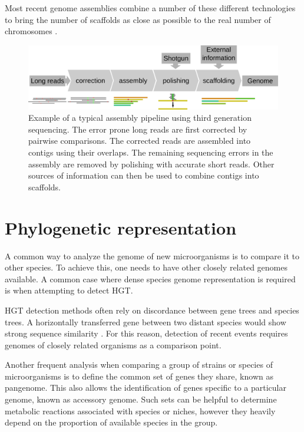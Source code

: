 Most recent genome assemblies combine a number of these different technologies to bring the number of scaffolds as close as possible to the real number of chromosomes .

\begin{figure}[htb]
    \includegraphics[width=\textwidth]{Parts/Part01/gfx/assembly_pipeline.pdf}
    \caption{Example of a typical assembly pipeline using third generation sequencing. The error prone long reads are first corrected by pairwise comparisons. The corrected reads are assembled into contigs using their overlaps. The remaining sequencing errors in the assembly are removed by polishing with accurate short reads. Other sources of information can then be used to combine contigs into scaffolds.}
    \label{fig:01-03:assembly}
\end{figure}

\section{Phylogenetic representation}

A common way to analyze the genome of new microorganisms is to compare it to other species. To achieve this, one needs to have other closely related genomes available. A common case where dense species genome representation is required is when attempting to detect \acrshort{HGT}.

\acrshort{HGT} detection methods often rely on discordance between gene trees and species trees. A horizontally transferred gene between two distant species would show strong sequence similarity \cite{ravenhallInferringHorizontalGene2015}. For this reason, detection of recent events requires genomes of closely related organisms as a comparison point.

Another frequent analysis when comparing a group of strains or species of microorganisms is to define the common set of genes they share, known as pangenome. This also allows the identification of genes specific to a particular genome, known as accessory genome. Such sets can be helpful to determine metabolic reactions associated with species or niches, however they heavily depend on the proportion of available species in the group.

